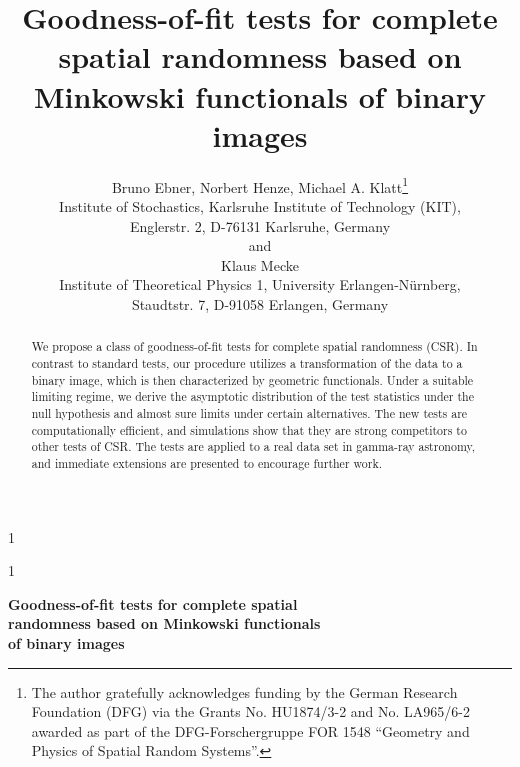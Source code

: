 \documentclass[12pt]{article}
\newcommand{\blind}{1}
\begin{document}
%

\def\spacingset#1{\renewcommand{\baselinestretch}%
{#1}\small\normalsize} \spacingset{1}



\blind
{
  \title{\bf Goodness-of-fit tests for complete spatial randomness based on Minkowski functionals of binary images}
  \author{Bruno Ebner, Norbert Henze,
    Michael A. Klatt\thanks{The author gratefully acknowledges funding by the German Research Foundation (DFG) via the Grants No. HU1874/3-2 and No. LA965/6-2 awarded as part of the DFG-Forschergruppe FOR 1548 ``Geometry and Physics of Spatial Random Systems''.}\\
    Institute of Stochastics, Karlsruhe Institute of Technology (KIT),\\
    Englerstr. 2, D-76131 Karlsruhe, Germany\\
    and \\
    Klaus Mecke\\
    Institute of Theoretical Physics 1, University Erlangen-N\"{u}rnberg,\\
    Staudtstr. 7, D-91058 Erlangen, Germany}
  \maketitle
} \fi

\blind
{
  \bigskip
  \bigskip
  \bigskip
  \begin{center}
    {\LARGE\bf Goodness-of-fit tests for complete spatial\\ randomness based on Minkowski functionals\\\bigskip of binary images}
  \end{center}
  \medskip
} \fi

\bigskip
\begin{abstract}
We propose a class of goodness-of-fit tests for complete spatial randomness (CSR). In contrast to standard tests, our procedure utilizes a transformation of the data to a binary image, which is then characterized by geometric functionals. Under a suitable limiting regime, we derive the asymptotic distribution of the test statistics under the null hypothesis and almost sure limits under certain alternatives. The new tests are computationally efficient, and simulations show that they are strong competitors to other tests of CSR. The tests are applied to a real data set in gamma-ray astronomy, and immediate extensions are presented to encourage further work.
\end{abstract}
\end{document}
